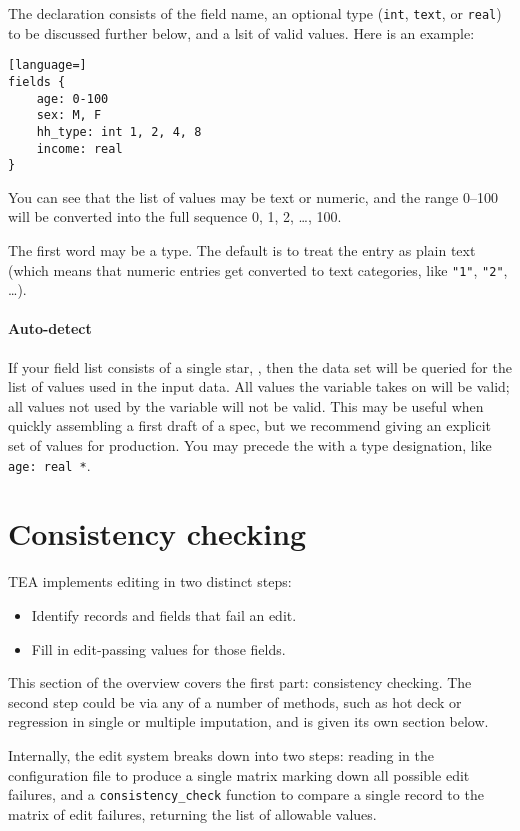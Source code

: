 \documentclass{article}
\def\tighten{ \setlength{\itemsep}{1pt}
    \setlength{\parskip}{0pt}}
\begin{document}
The declaration consists of the field name, an
optional type ({\tt int}, {\tt text}, or {\tt real}) to be discussed further below, and a
lsit of valid values. Here is an example:

\begin{lstlisting}[language=]
fields {
    age: 0-100
    sex: M, F
    hh_type: int 1, 2, 4, 8
    income: real
}
\end{lstlisting}

You can see that the list of values may be text or numeric, and the range 0--100 will be
converted into the full sequence 0, 1, 2, \dots, 100.  

The first word may be a type. The default is to treat the entry as plain text (which means
that numeric entries get converted to text categories, like {\tt "1"}, {\tt "2"}, \dots).

\paragraph{Auto-detect} If your field list consists of a single star, {\tt *}, then the
data set will be queried for the list of values used in the input data. All values the
variable takes on will be valid; all values not used by the variable will not be valid.
This may be useful when quickly assembling a first draft of a spec, but we recommend
giving an explicit set of values for production. You may precede the {\tt *}
with a type designation, like {\tt age: real *}.



\section{Consistency checking}\label{consistencysection}
TEA implements editing in two distinct steps:
\begin{itemize}
\tighten
\item Identify records and fields that fail an edit.
\item Fill in edit-passing values for those fields.
\end{itemize}

This section of the overview covers the first part: consistency checking. 
The second step could be via any of a number of methods, such as hot deck or
regression in single or multiple imputation, and is given its own section below. 

Internally, the edit system breaks down into two steps: reading in the
configuration file to produce a single matrix marking down all possible edit
failures, and a {\tt consistency\_check} function to compare a single record to
the matrix of edit failures, returning the list of allowable values. 
\end{document}
